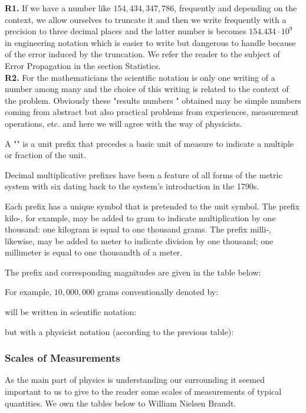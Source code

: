 	 
	\begin{tcolorbox}[title=Remarks,colframe=black,arc=10pt]
	\textbf{R1.} If we have a number like $154,434,347,786$, frequently and depending on the context, we allow ourselves to truncate it and then we write frequently with a precision to three decimal places and the latter number is becomes $154.434\cdot 10^9$ in engineering notation which is easier to write but dangerous to handle because of the error induced by the truncation. We refer the reader to the subject of Error Propagation in the section Statistics.\\
	
	\textbf{R2.} For the mathematicians the scientific notation is only one writing of a number among many and the choice of this writing is related to the context of the problem. Obviously these "results numbers " obtained may be simple numbers coming from abstract but also practical problems from experiences, measurement operations, etc. and here we will agree with the way of physicists.
	\end{tcolorbox}	
	A "" is a unit prefix that precedes a basic unit of measure to indicate a multiple or fraction of the unit.
	
	Decimal multiplicative prefixes have been a feature of all forms of the metric system with six dating back to the system's introduction in the 1790s.
	
	Each prefix has a unique symbol that is pretended to the unit symbol. The prefix kilo-, for example, may be added to gram to indicate multiplication by one thousand: one kilogram is equal to one thousand grams. The prefix milli-, likewise, may be added to meter to indicate division by one thousand; one millimeter is equal to one thousandth of a meter.
	
	The prefix and corresponding magnitudes are given in the table below:
	
	For example, $10,000,000$ grams  conventionally denoted by:
	
	will be written in scientific notation:
	
	but with a physicist notation (according to the previous table):	
	
	
	\pagebreak
	\subsubsection{Scales of Measurements}
	As the main part of physics is understanding our surrounding it seemed important to us to give to the reader some scales of measurements of typical quantities. We own the tables below to William Nielsen Brandt.
	
